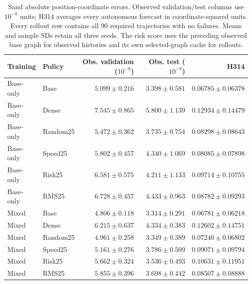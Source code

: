 \begin{table}[!ht]
\centering\small
\setlength{\tabcolsep}{5pt}\renewcommand{\arraystretch}{1.12}
\caption{Sand absolute position-coordinate errors. Observed validation/test columns use $10^{-8}$ units; H314 averages every autonomous forecast in coordinate-squared units. Every rollout row contains all 90 required trajectories with no failures. Means and sample SDs retain all three seeds. The risk score uses the preceding observed base graph for observed histories and its own selected-graph cache for rollouts.}
\label{tab:sand-all-observed}
\label{tab:sand-all-rollouts}
\begin{tabular}{llrrr}
\toprule
Training & Policy & Obs. validation ($10^{-8}$) & Obs. test ($10^{-8}$) & H314\\
\midrule
Base-only & Base & $5.099\pm0.216$ & $3.398\pm0.581$ & $0.06785\pm0.06378$\\
Base-only & Dense & $7.545\pm0.865$ & $5.800\pm1.139$ & $0.12934\pm0.14479$\\
Base-only & Random25 & $5.472\pm0.362$ & $3.735\pm0.754$ & $0.08298\pm0.08643$\\
Base-only & Speed25 & $5.802\pm0.457$ & $4.340\pm1.069$ & $0.08085\pm0.07898$\\
Base-only & Risk25 & $6.581\pm0.575$ & $4.211\pm1.133$ & $0.09714\pm0.10755$\\
Base-only & RMS25 & $6.728\pm0.457$ & $4.433\pm0.963$ & $0.08782\pm0.09293$\\
Mixed & Base & $4.806\pm0.118$ & $3.314\pm0.291$ & $0.06781\pm0.06218$\\
Mixed & Dense & $6.215\pm0.637$ & $4.334\pm0.383$ & $0.12602\pm0.14751$\\
Mixed & Random25 & $4.961\pm0.258$ & $3.349\pm0.389$ & $0.07240\pm0.06802$\\
Mixed & Speed25 & $5.161\pm0.276$ & $3.786\pm0.509$ & $0.09071\pm0.09794$\\
Mixed & Risk25 & $5.662\pm0.324$ & $3.536\pm0.493$ & $0.10631\pm0.11951$\\
Mixed & RMS25 & $5.855\pm0.396$ & $3.698\pm0.442$ & $0.08507\pm0.08888$\\
\bottomrule
\end{tabular}
\end{table}
